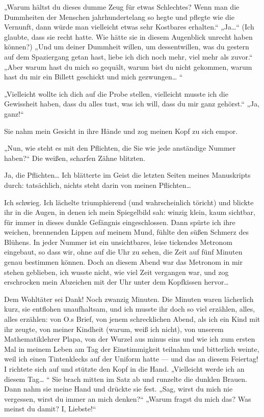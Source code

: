 „Warum hältst du dieses dumme Zeug für etwas Schlechtes? Wenn man
die Dummheiten der Menschen jahrhundertelang so hegte und pflegte
wie die Vernunft, dann würde man vielleicht etwas sehr Kostbares
erhalten.“ „Ja\ldots{}“ (Ich glaubte, dass sie recht hatte. Wie hätte
sie in diesem Augenblick unrecht haben können?) „Und um deiner
Dummheit willen, um dessentwillen, was du gestern auf dem
Spaziergang getan hast, liebe ich dich noch mehr, viel mehr als
zuvor.“ „Aber warum hast du mich so gequält, warum bist du nicht
gekommen, warum hast du mir ein Billett geschickt und mich
gezwungen\ldots{} “

„Vielleicht wollte ich dich auf die Probe stellen, vielleicht
musste ich die Gewissheit haben, dass du alles tust, was ich will,
dass du mir ganz gehörst.“ „Ja, ganz!“

Sie nahm mein Gesicht in ihre Hände und zog meinen Kopf zu sich
empor.

„Nun, wie steht es mit den Pflichten, die Sie wie jede anständige
Nummer haben?“ Die weißen, scharfen Zähne blitzten.

Ja, die Pflichten\ldots{} Ich blätterte im Geist die letzten Seiten
meines Manuskripts durch: tatsächlich, nichts steht darin von
meinen Pflichten\ldots{}

Ich schwieg. Ich lächelte triumphierend (und wahrscheinlich
töricht) und blickte ihr in die Augen, in denen ich mein
Spiegelbild sah: winzig klein, kaum sichtbar, für immer in dieses
dunkle Gefängnis eingeschlossen. Dann spürte ich ihre weichen,
brennenden Lippen auf meinem Mund, fühlte den süßen Schmerz des
Blühens. In jeder Nummer ist ein unsichtbares, leise tickendes
Metronom eingebaut, so dass wir, ohne auf die Uhr zu sehen, die
Zeit auf fünf Minuten genau bestimmen können. Doch an diesem Abend
war das Metronom in mir stehen geblieben, ich wusste nicht, wie
viel Zeit vergangen war, und zog erschrocken mein Abzeichen mit der
Uhr unter dem Kopfkissen hervor\ldots{}

Dem Wohltäter sei Dank! Noch zwanzig Minuten. Die Minuten waren
lächerlich kurz, sie entflohen unaufhaltsam, und ich musste ihr
doch so viel erzählen, alles, alles erzählen: von O.s Brief, von
jenem schrecklichen Abend, als ich ein Kind mit ihr zeugte, von
meiner Kindheit (warum, weiß ich nicht), von unserem
Mathematiklehrer Plapa, von der Wurzel aus minus eins und wie ich
zum ersten Mal in meinem Leben am Tag der Einstimmigkeit teilnahm
und bitterlich weinte, weil ich einen Tintenklecks auf der Uniform
hatte — und das an diesem Feiertag! I richtete sich auf und stützte
den Kopf in die Hand. „Vielleicht werde ich an diesem Tag\ldots{} “ Sie
brach mitten im Satz ab und runzelte die dunklen Brauen. Dann nahm
sie meine Hand und drückte sie fest. „Sag, wirst du mich nie
vergessen, wirst du immer an mich denken?“ „Warum fragst du mich
das? Was meinst du damit? I, Liebste!“

